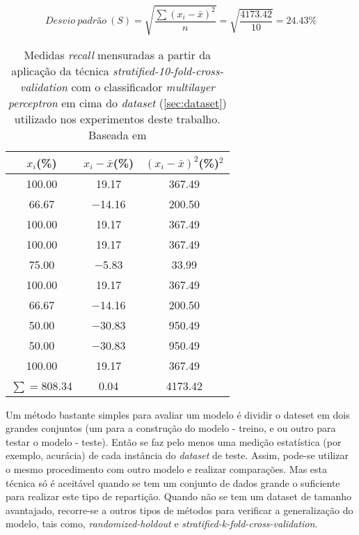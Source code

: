 \begin{equation} 
  Desvio~padrão~(S) = \sqrt{\frac{\sum{(x_{i}-\bar{x})^2}}{n}}=\sqrt{\frac{4173.42}{10}}=24.43\%
  \label{eq:standarddevapli}
\end{equation}

\begin{table}[!htp]
  \centering
  \begin{tabular}{|c c c|}
    \hline
       {\bf $x_{i}$(\%)} & {\bf $x_{i}-\bar{x}$(\%)} & {\bf $(x_{i}-\bar{x})^2$(\%)$^2$} \\
    \hline
       100.00 & 19.17 & 367.49\\
    \hline
       66.67 & −14.16 &  200.50\\
     \hline
       100.00 & 19.17 & 367.49\\
    \hline
       100.00 & 19.17 & 367.49\\
     \hline
       75.00 & −5.83 & 33.99\\
    \hline
       100.00 & 19.17 & 367.49\\
     \hline
       66.67 & −14.16 & 200.50\\
    \hline
       50.00 & −30.83 & 950.49\\
     \hline
       50.00 & −30.83 &  950.49\\
    \hline
       100.00 & 19.17 & 367.49\\
    \hline\hline
       $\sum=$808.34 & 0.04 &  4173.42\\
    \hline
  \end{tabular}
  \caption{Medidas \textit{recall} mensuradas a partir da aplicação da técnica \textit{stratified-10-fold-cross-validation} com o classificador \textit{multilayer perceptron} em cima do \textit{dataset} (\ref{sec:dataset}) utilizado nos experimentos deste trabalho. Baseada em \cite{Kerr:2002}}
  \label{table:datakcrossvalidation}
\end{table}
                    
Um método bastante simples para avaliar um modelo é dividir o dateset em dois grandes conjuntos (um para a construção do modelo - treino, e ou outro para testar o modelo - teste). Então se faz pelo menos uma medição estatística (por exemplo, acurácia) de cada instância do \textit{dataset} de teste. Assim, pode-se utilizar o mesmo procedimento com outro modelo e realizar comparações. Mas esta técnica só é aceitável quando se tem um conjunto de dados grande o suficiente para realizar este tipo de repartição.\cite{Kotsiantis:2007} Quando não se tem um dataset de tamanho avantajado, recorre-se a outros tipos de métodos para verificar a generalização do modelo, tais como, \textit{randomized-holdout} e \textit{stratified-k-fold-cross-validation}.\cite{Witten:2005}

